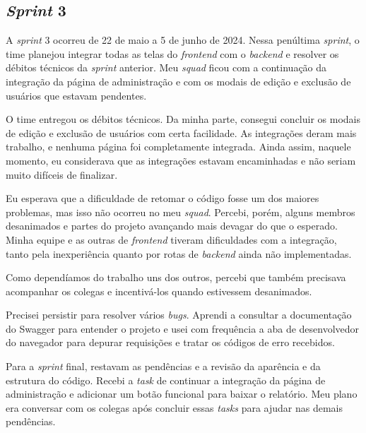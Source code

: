 \subsection{\textit{Sprint} 3}

A \textit{sprint} 3 ocorreu de 22 de maio a 5 de junho de 2024. Nessa penúltima
\textit{sprint}, o time planejou integrar todas as telas do
\textit{frontend} com o \textit{backend} e resolver os débitos técnicos da
\textit{sprint} anterior. Meu \textit{squad} ficou com a continuação da integração
da página de administração e com os modais de edição e exclusão de usuários
que estavam pendentes.

O time entregou os débitos técnicos. Da minha parte, consegui concluir os
modais de edição e exclusão de usuários com certa facilidade. As integrações
deram mais trabalho, e nenhuma página foi completamente integrada. Ainda assim,
naquele momento, eu considerava que as integrações estavam encaminhadas e
não seriam muito difíceis de finalizar.

Eu esperava que a dificuldade de retomar o código fosse um dos maiores
problemas, mas isso não ocorreu no meu \textit{squad}. Percebi, porém, alguns
membros desanimados e partes do projeto avançando mais devagar do que o
esperado. Minha equipe e as outras de \textit{frontend} tiveram dificuldades
com a integração, tanto pela inexperiência quanto por rotas de \textit{backend}
ainda não implementadas.

Como dependíamos do trabalho uns dos outros, percebi que também precisava
acompanhar os colegas e incentivá-los quando estivessem desanimados.

Precisei persistir para resolver vários \textit{bugs}. Aprendi a consultar a
documentação do Swagger \cite{swagger-docs} para entender o projeto e usei com
frequência a aba de desenvolvedor do navegador para depurar requisições e tratar
os códigos de erro recebidos.

Para a \textit{sprint} final, restavam as pendências e a revisão da aparência e
da estrutura do código. Recebi a \textit{task} de continuar a integração da
página de administração e adicionar um botão funcional para baixar o relatório.
Meu plano era conversar com os colegas após concluir essas \textit{tasks} para
ajudar nas demais pendências.
